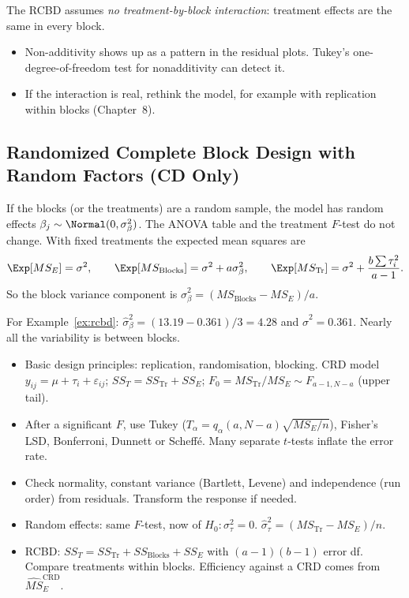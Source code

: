 The RCBD assumes \emph{no treatment-by-block interaction}: treatment effects are the same in every block.
\begin{itemize}
  \item Non-additivity shows up as a pattern in the residual plots. Tukey's one-degree-of-freedom test for nonadditivity can detect it.
  \item If the interaction is real, rethink the model, for example with replication within blocks (Chapter~8).
\end{itemize}

\subsection{Randomized Complete Block Design with Random Factors (CD Only)}

If the blocks (or the treatments) are a random sample, the model has random effects $\beta_j\sim\Normal(0,\sigma_\beta^2)$. The ANOVA table and the treatment $F$-test do not change. With fixed treatments the expected mean squares are
\[ \Exp[MS_E]=\sigma^2,\qquad\Exp[MS_{\mathrm{Blocks}}]=\sigma^2+a\sigma_\beta^2,\qquad\Exp[MS_{\mathrm{Tr}}]=\sigma^2+\frac{b\sum\tau_i^2}{a-1}. \]
So the block variance component is $\hat\sigma_\beta^2=(MS_{\mathrm{Blocks}}-MS_E)/a$.

For Example~\ref{ex:rcbd}: $\hat\sigma_\beta^2=(13.19-0.361)/3=4.28$ and $\hat\sigma^2=0.361$. Nearly all the variability is between blocks.

\begin{summarybox}
\begin{itemize}
  \item Basic design principles: replication, randomisation, blocking. CRD model $y_{ij}=\mu+\tau_i+\varepsilon_{ij}$; $SS_T=SS_{\mathrm{Tr}}+SS_E$; $F_0=MS_{\mathrm{Tr}}/MS_E\sim F_{a-1,N-a}$ (upper tail).
  \item After a significant $F$, use Tukey ($T_\alpha=q_\alpha(a,N-a)\sqrt{MS_E/n}$), Fisher's LSD, Bonferroni, Dunnett or Scheff\'e. Many separate $t$-tests inflate the error rate.
  \item Check normality, constant variance (Bartlett, Levene) and independence (run order) from residuals. Transform the response if needed.
  \item Random effects: same $F$-test, now of $H_0:\sigma_\tau^2=0$. $\hat\sigma_\tau^2=(MS_{\mathrm{Tr}}-MS_E)/n$.
  \item RCBD: $SS_T=SS_{\mathrm{Tr}}+SS_{\mathrm{Blocks}}+SS_E$ with $(a-1)(b-1)$ error df. Compare treatments within blocks. Efficiency against a CRD comes from $\widehat{MS}_E^{\mathrm{CRD}}$.
\end{itemize}
\end{summarybox}

